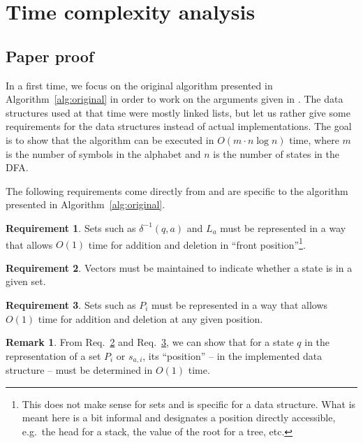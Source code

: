 \documentclass[12pt, a4 paper]{article}
\theoremstyle{definition}
\newtheorem{remark}{Remark}
\newtheorem{requirement}{Requirement}
\begin{document}
\section{Time complexity analysis}

\subsection{Paper proof}

In a first time, we focus on the original algorithm presented in Algorithm~\ref{alg:original} in order to work on the arguments given in \cite{Hop71}.
The data structures used at that time were mostly linked lists, but let us rather give some requirements for the data structures instead of actual implementations.
The goal is to show that the algorithm can be executed in $O(m \cdot n \log n)$ time, where $m$ is the number of symbols in the alphabet and $n$ is the number of states in the DFA.

The following requirements come directly from \cite{Hop71} and are specific to the algorithm presented in Algorithm~\ref{alg:original}.

\begin{requirement}
    \label{req:1}
Sets such as $\delta^{-1}(q, a)$ and $L_a$ must be represented in a way that allows $O(1)$ time for addition and deletion in ``front position''\footnote{This does not make sense for sets and is specific for a data structure. What is meant here is a bit informal and designates a position directly accessible, e.g.\ the head for a stack, the value of the root for a tree, etc.}.
\end{requirement}

\begin{requirement}
    \label{req:2}
Vectors must be maintained to indicate whether a state is in a given set.
\end{requirement}

\begin{requirement}
    \label{req:3}
Sets such as $P_i$ must be represented in a way that allows $O(1)$ time for addition and deletion at any given position.
\end{requirement}

\begin{remark}
    \label{req:4}
From Req.\ \ref{req:2} and Req.\ \ref{req:3}, we can show that for a state $q$ in the representation of a set $P_i$ or $s_{a,i}$, its ``position'' -- in the implemented data structure -- must be determined in $O(1)$ time.
\end{remark}
\end{document}
